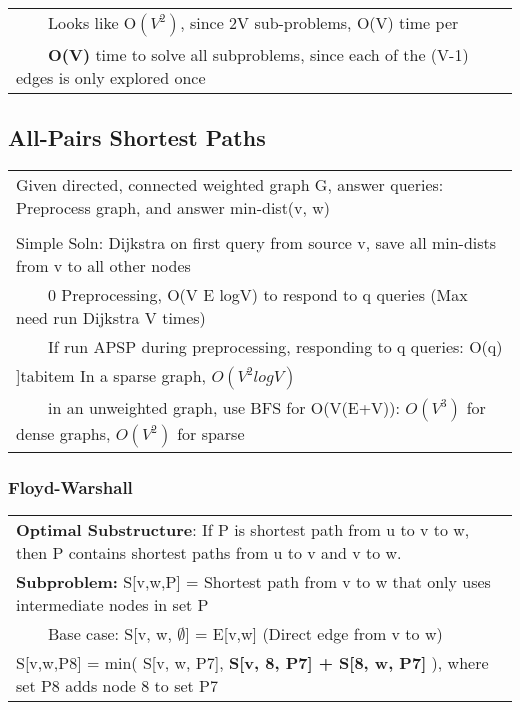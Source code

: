 \documentclass{article}
\newcommand{\tabitem}{~~\llap{\textbullet}~~}
\begin{document}
    \begin{tabular}{l}
        \tabitem Looks like O$(V^{2})$, since 2V sub-problems, O(V) time per\\
        \tabitem \textbf{O(V)} time to solve all subproblems, since each of the (V-1) edges is only explored once\\
    \end{tabular}

    \pagebreak

    \subsection{All-Pairs Shortest Paths}

    \begin{tabular}{l}
        Given directed, connected weighted graph G, answer queries: Preprocess graph, and answer min-dist(v, w)\\\\
        Simple Soln: Dijkstra on first query from source v, save all min-dists from v to all other nodes\\
        \tabitem 0 Preprocessing, O(V E logV) to respond to q queries (Max need run Dijkstra V times)\\
        \tabitem If run APSP during preprocessing, responding to q queries: O(q)\\
        ]tabitem In a sparse graph, $O(V^{2}logV)$\\
        \tabitem in an unweighted graph, use BFS for O(V(E+V)): $O(V^{3})$ for dense graphs,  $O(V^{2})$ for sparse\\
    \end{tabular}

    \subsubsection{Floyd-Warshall}
    
    \begin{tabular}{l}
        \textbf{Optimal Substructure}: If P is shortest path from u to v to w, then P contains shortest paths from u to v and v to w.\\
        \textbf{Subproblem:} S[v,w,P] = Shortest path from v to w that only uses intermediate nodes in set P\\
        \tabitem Base case: S[v, w, $\emptyset$] = E[v,w] (Direct edge from v to w)\\
        S[v,w,P8] = min( S[v, w, P7], \textbf{S[v, 8, P7] + S[8, w, P7]} ), where set P8 adds node 8 to set P7\\
    \end{tabular}
\end{document}
